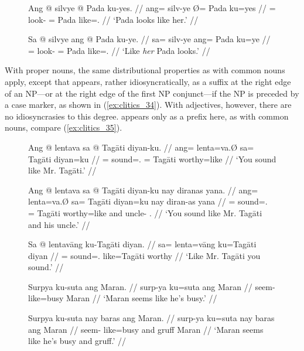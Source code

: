 \begin{figure}[h]
\pex\label{ex:clitics_33}
\a\label{ex:clitics_33a}\begingl
	\gla Ang @ silvye {} @ Pada ku-yes. //
	\glb ang= silv-ye Ø= Pada ku=yes //
	\glc \AgtT{}= look-\TsgF{} \Top{}= Pada like=\TsgF{}.\Parg{} //
	\glft `Pada looks like her.' //
\endgl

\a\label{ex:clitics_33b}\begingl
	\gla Sa @ silvye ang @ Pada ku-ye. //
	\glb sa= silv-ye ang= Pada ku=ye //
	\glc \PatT{}= look-\TsgF{} \Aarg{}= Pada like=\TsgF{}.\Top{} //
	\glft `Like \emph{her} Pada looks.' //
\endgl
\xe
\end{figure}

With proper nouns, the same distributional properties as with common nouns
apply, except that  appears, rather idiosyncratically, as a
suffix at the right edge of an NP---or at the right edge of the first NP
conjunct---if the NP is preceded by a case marker, as shown in
(\ref{ex:clitics_34}). \label{clitics_preadj_ku} With adjectives, however,
there are no idiosyncrasies to this degree.  appears only as a
prefix here, as with common nouns, compare (\ref{ex:clitics_35}).

\begin{figure}[h]
\pex\label{ex:clitics_34}
\a\label{ex:clitics_34a}\begingl
	\gla Ang @ lentava sa @ Tagāti diyan-ku. //
	\glb ang= lenta=va.Ø sa= Tagāti diyan=ku //
	\glc \AgtT{}= sound=\Second{}.\Top{} \Parg{}= Tagāti worthy=like //
	\glft `You sound like Mr. Tagāti.' //
\endgl

\a\label{ex:clitics_34b}\begingl
	\gla Ang @ lentava sa @ Tagāti diyan-ku nay diranas yana. //
	\glb ang= lenta=va.Ø sa= Tagāti diyan=ku nay diran-as yana //
	\glc \AgtT{}= sound=\Second{}.\Top{} \Parg{}= Tagāti worthy=like and 
		uncle-\Parg{} \TsgM{}.\Gen{} //
	\glft `You sound like Mr. Tagāti and his uncle.' //
\endgl

\a\label{ex:clitics_34c}\begingl
	\gla Sa @ lentavāng ku-​Tagāti diyan. //
	\glb sa= lenta=vāng ku=​Tagāti diyan //
	\glc \PatT{}= sound=\Second{}.\Aarg{} like=​Tagāti worthy //
	\glft `Like Mr. Tagāti you sound.' //
\endgl
\xe
\end{figure}

\begin{figure}[h]
\pex\label{ex:clitics_35}
\a\label{ex:clitics_35a}\begingl
	\gla Surpya ku-suta ang Maran. //
	\glb surp-ya ku=suta ang Maran //
	\glc seem-\TsgM{} like=busy \Aarg{} Maran //
	\glft `Maran seems like he's busy.' //
\endgl

\a\label{ex:clitics_35b}\begingl
	\gla Surpya ku-suta nay baras ang Maran. //
	\glb surp-ya ku=suta nay baras ang Maran //
	\glc seem-\TsgM{} like=busy and gruff \Aarg{} Maran //
	\glft `Maran seems like he's busy and gruff.' //
\endgl
\xe
\end{figure}

